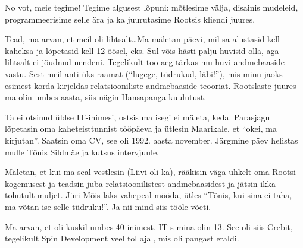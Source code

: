 
No vot, meie tegime! Tegime algusest lõpuni: mõtlesime välja, disainis mudeleid, programmeerisime selle ära ja ka juurutasime Rootsis kliendi juures. 


Tead, ma arvan, et meil oli lihtsalt\ldots Ma  mäletan päevi, mil sa alustasid kell kaheksa ja lõpetasid kell 12 öösel, eks.  Sul võis hästi palju huvisid olla, aga lihtsalt ei jõudnud nendeni. Tegelikult too aeg tärkas mu huvi andmebaaside vastu. Sest meil anti üks raamat (\enquote{lugege, tüdrukud, läbi!}), mis minu jaoks esimest korda kirjeldas  relatsiooniliste andmebaaside teooriat. Rootslaste juures ma olin umbes aasta, siis  nägin Hansapanga kuulutust. 


Ta ei otsinud üldse IT-inimesi, ostsis ma isegi ei mäleta, keda. Parasjagu lõpetasin oma kaheteisttunnist tööpäeva ja ütlesin Maarikale, et \enquote{okei, ma kirjutan}. Saatsin oma CV, see oli 1992. aasta november. Järgmine päev helistas mulle Tõnis Sildmäe ja kutsus intervjuule. 

Mäletan, et kui ma seal vestlesin (Liivi oli ka), rääkisin väga uhkelt oma Rootsi kogemusest ja teadsin juba relatsioonilistest andmebaasidest ja jätsin ikka tohutult muljet.  Jüri Mõis läks vahepeal mööda, ütles \enquote{Tõnis, kui sina ei taha, ma võtan ise selle tüdruku!}.  Ja nii mind siis tööle võeti. 

Ma arvan, et  oli kuskil umbes 40 inimest. IT-s mina olin 13. See oli siis Crebit, tegelikult Spin Development veel tol ajal, mis oli pangast eraldi. 



